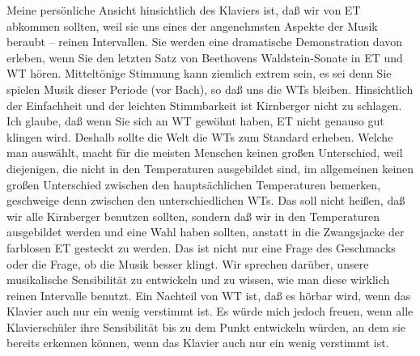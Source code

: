 Meine persönliche Ansicht hinsichtlich des Klaviers ist, daß wir von ET abkommen sollten, weil sie uns eines der angenehmsten Aspekte der Musik beraubt -- reinen Intervallen.
Sie werden eine dramatische Demonstration davon erleben, wenn Sie den letzten Satz von Beethovens Waldstein-Sonate in ET und WT hören.
Mitteltönige Stimmung kann ziemlich extrem sein, es sei denn Sie spielen Musik dieser Periode (vor Bach), so daß uns die WTs bleiben.
Hinsichtlich der Einfachheit und der leichten Stimmbarkeit ist Kirnberger nicht zu schlagen.
Ich glaube, daß wenn Sie sich an WT gewöhnt haben, ET nicht genauso gut klingen wird.
Deshalb sollte die Welt die WTs zum Standard erheben.
Welche man auswählt, macht für die meisten Menschen keinen großen Unterschied, weil diejenigen, die nicht in den Temperaturen ausgebildet sind, im allgemeinen keinen großen Unterschied zwischen den hauptsächlichen Temperaturen bemerken, geschweige denn zwischen den unterschiedlichen WTs.
Das soll nicht heißen, daß wir alle Kirnberger benutzen sollten, sondern daß wir in den Temperaturen ausgebildet werden und eine Wahl haben sollten, anstatt in die Zwangsjacke der farblosen ET gesteckt zu werden.
Das ist nicht nur eine Frage des Geschmacks oder die Frage, ob die Musik besser klingt.
Wir sprechen darüber, unsere musikalische Sensibilität zu entwickeln und zu wissen, wie man diese wirklich reinen Intervalle benutzt.
Ein Nachteil von WT ist, daß es hörbar wird, wenn das Klavier auch nur ein wenig verstimmt ist.
Es würde mich jedoch freuen, wenn alle Klavierschüler ihre Sensibilität bis zu dem Punkt entwickeln würden, an dem sie bereits erkennen können, wenn das Klavier auch nur ein wenig verstimmt ist.



